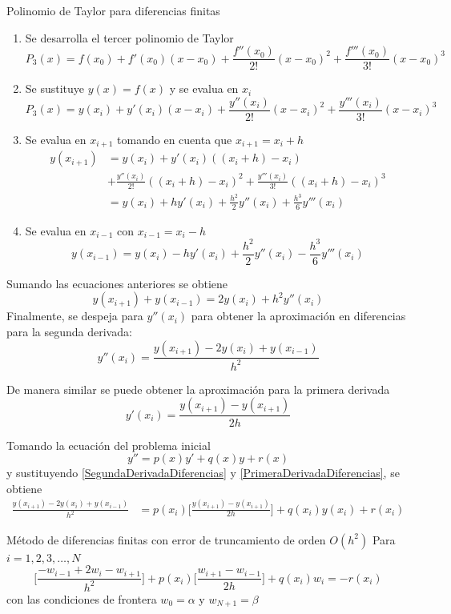 \begin{frame}{Polinomio de Taylor para diferencias finitas}
\begin{enumerate}
\item Se desarrolla el tercer polinomio de Taylor
$$P_3(x)=f(x_0)+f'(x_0)(x-x_0)+\frac{f''(x_0)}{2!}(x-x_0)^2+\frac{f'''(x_0)}{3!}(x-x_0)^3$$
\item Se sustituye $y(x)=f(x)$ y se evalua en $x_i$
$$P_3(x)=y(x_i)+y'(x_i)(x-x_i)+\frac{y''(x_i)}{2!}(x-x_i)^2+\frac{y'''(x_i)}{3!}(x-x_i)^3$$
\item Se evalua en $x_{i+1}$ tomando en cuenta que $x_{i+1}=x_i+h$
\begin{align*}
y(x_{i+1})&=y(x_i)+y'(x_i)((x_i+h)-x_i)\\
&+\frac{y''(x_i)}{2!}((x_i+h)-x_i)^2+\frac{y'''(x_i)}{3!}((x_i+h)-x_i)^3\\
&=y(x_i)+hy'(x_i)+\frac{h^2}{2}y''(x_i)+\frac{h^3}{6}y'''(x_i)
\end{align*}
\item Se evalua en $x_{i-1}$ con $x_{i-1}=x_i-h$
$$y(x_{i-1})=y(x_i)-hy'(x_i)+\frac{h^2}{2}y''(x_i)-\frac{h^3}{6}y'''(x_i)$$
\end{enumerate}
\end{frame}


\begin{frame}
Sumando las ecuaciones anteriores se obtiene
$$y(x_{i+1})+y(x_{i-1})=2y(x_i)+h^2y''(x_i)$$
Finalmente, se despeja para $y''(x_i)$ para obtener la aproximación en diferencias para la segunda derivada:
\begin{equation}
y''(x_i)=\frac{y(x_{i+1})-2y(x_i)+y(x_{i-1})}{h^2}
\label{SegundaDerivadaDiferencias}
\end{equation}

De manera similar se puede obtener la aproximación para la primera derivada 
\begin{equation}
y'(x_i)= \frac{y(x_{i+1})-y(x_{i+1})}{2h}
\label{PrimeraDerivadaDiferencias}
\end{equation}
\end{frame}

\begin{frame}
Tomando la ecuación del problema inicial 
$$y''=p(x)y'+q(x)y+r(x)$$
y sustituyendo \eqref{SegundaDerivadaDiferencias} y \eqref{PrimeraDerivadaDiferencias}, se obtiene
\begin{align*}
\frac{y(x_{i+1})-2y(x_i)+y(x_{i-1})}{h^2}  &=
p(x_i)\bigg[ \frac{y(x_{i+1})-y(x_{i+1})}{2h}\bigg]+q(x_i)y(x_i)+r(x_i)
\end{align*}

\begin{block}{Método de diferencias finitas con error de truncamiento de orden $O(h^2)$}
Para $i=1, 2, 3, \hdots, N$
$$\bigg[\frac{-w_{i-1}+2w_i-w_{i+1}}{h^2}\bigg]+p(x_i)\bigg[\frac{w_{i+1}-w_{i-1}}{2h}\bigg]+q(x_i)w_i=-r(x_i)$$
con las condiciones de frontera
$w_0=\alpha$ y $w_{N+1}=\beta$
\end{block}
\end{frame}

